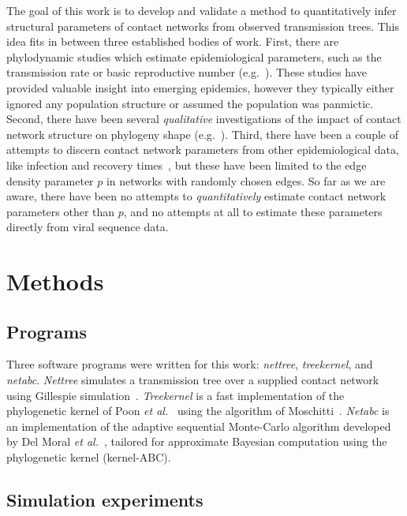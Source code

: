 \documentclass{article}
\newcommand{\sw}[1]{\textit{#1}}
\newcommand{\etal}{\textit{et al.}}
\begin{document}
The goal of this work is to develop and validate a method to quantitatively
infer structural parameters of contact networks from observed transmission
trees. This idea fits in between three established bodies of work. First, there
are phylodynamic studies which estimate epidemiological parameters, such as the
transmission rate or basic reproductive number
(e.g.~\autocite{stadler2011estimating, volz2012simple}). These studies have
provided valuable insight into emerging epidemics, however they typically
either ignored any population structure or assumed the population was
panmictic. Second, there have been several \emph{qualitative} investigations of
the impact of contact network structure on phylogeny shape
(e.g.~\autocite{leventhal2012inferring, colijn2014phylogenetic, o2010contact}).
Third, there have been a couple of attempts to discern contact network
parameters from other epidemiological data, like infection and recovery
times~\autocite{britton2002bayesian, groendyke2011bayesian}, but these have
been limited to the edge density parameter $p$ in networks with randomly chosen
edges. So far as we are aware, there have been no attempts to
\emph{quantitatively} estimate contact network parameters other than $p$, and
no attempts at all to estimate these parameters directly from viral sequence
data.

\section{Methods}

\subsection{Programs}

Three software programs were written for this work: \sw{nettree},
\sw{treekernel}, and \sw{netabc}. \sw{Nettree} simulates a transmission tree
over a supplied contact network using Gillespie
simulation~\autocite{gillespie1976general}. \sw{Treekernel} is a fast
implementation of the phylogenetic kernel of Poon
\etal~\autocite{poon2013mapping} using the algorithm of
Moschitti~\autocite{moschitti2006making}. \sw{Netabc} is an implementation of
the adaptive sequential Monte-Carlo algorithm developed by Del Moral
\etal~\autocite{del2012adaptive}, tailored for approximate Bayesian computation
using the phylogenetic kernel (kernel-ABC).

\subsection{Simulation experiments}
\end{document}
